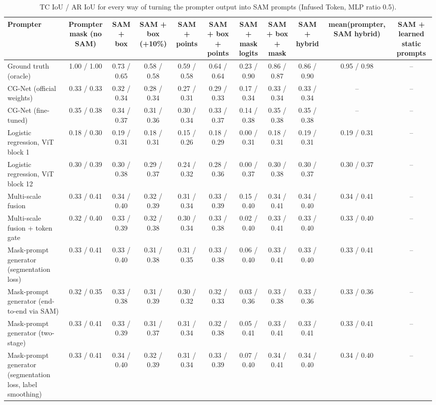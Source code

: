 \begin{table}[htbp]
\centering
\small
\begin{adjustbox}{max width=\linewidth}
\begin{tabular}{lcccccccccc}
\toprule
Prompter & Prompter mask (no SAM) & SAM + box & SAM + box (+10\%) & SAM + points & SAM + box + points & SAM + mask logits & SAM + box + mask & SAM + hybrid & mean(prompter, SAM hybrid) & SAM + learned static prompts \\
\midrule
Ground truth (oracle) & 1.00 / 1.00 & 0.73 / 0.65 & 0.58 / 0.58 & 0.59 / 0.58 & 0.64 / 0.64 & 0.23 / 0.90 & 0.86 / 0.87 & 0.86 / 0.90 & 0.95 / 0.98 & -- \\
CG-Net (official weights) & 0.33 / 0.33 & 0.32 / 0.34 & 0.28 / 0.34 & 0.27 / 0.31 & 0.29 / 0.33 & 0.17 / 0.34 & 0.33 / 0.34 & 0.33 / 0.34 & -- & -- \\
CG-Net (fine-tuned) & 0.35 / 0.38 & 0.34 / 0.37 & 0.31 / 0.36 & 0.30 / 0.34 & 0.33 / 0.37 & 0.14 / 0.38 & 0.35 / 0.38 & 0.35 / 0.38 & -- & -- \\
Logistic regression, ViT block 1 & 0.18 / 0.30 & 0.19 / 0.31 & 0.18 / 0.31 & 0.15 / 0.26 & 0.18 / 0.29 & 0.00 / 0.31 & 0.18 / 0.31 & 0.19 / 0.31 & 0.19 / 0.31 & -- \\
Logistic regression, ViT block 12 & 0.30 / 0.39 & 0.30 / 0.38 & 0.29 / 0.37 & 0.24 / 0.32 & 0.28 / 0.36 & 0.00 / 0.37 & 0.30 / 0.38 & 0.30 / 0.37 & 0.30 / 0.37 & -- \\
Multi-scale fusion & 0.33 / 0.41 & 0.34 / 0.40 & 0.32 / 0.39 & 0.31 / 0.34 & 0.33 / 0.39 & 0.15 / 0.40 & 0.34 / 0.41 & 0.34 / 0.40 & 0.34 / 0.41 & -- \\
Multi-scale fusion + token gate & 0.32 / 0.40 & 0.33 / 0.39 & 0.32 / 0.38 & 0.30 / 0.34 & 0.33 / 0.38 & 0.02 / 0.40 & 0.33 / 0.41 & 0.33 / 0.40 & 0.33 / 0.40 & -- \\
Mask-prompt generator (segmentation loss) & 0.33 / 0.41 & 0.33 / 0.40 & 0.31 / 0.38 & 0.31 / 0.35 & 0.33 / 0.38 & 0.06 / 0.40 & 0.33 / 0.41 & 0.33 / 0.40 & 0.33 / 0.41 & -- \\
Mask-prompt generator (end-to-end via SAM) & 0.32 / 0.35 & 0.33 / 0.38 & 0.31 / 0.39 & 0.30 / 0.32 & 0.32 / 0.33 & 0.03 / 0.36 & 0.33 / 0.38 & 0.33 / 0.36 & 0.33 / 0.36 & -- \\
Mask-prompt generator (two-stage) & 0.33 / 0.41 & 0.33 / 0.39 & 0.31 / 0.37 & 0.31 / 0.34 & 0.32 / 0.38 & 0.05 / 0.41 & 0.33 / 0.41 & 0.33 / 0.41 & 0.33 / 0.41 & -- \\
Mask-prompt generator (segmentation loss, label smoothing) & 0.33 / 0.41 & 0.34 / 0.40 & 0.32 / 0.39 & 0.31 / 0.34 & 0.33 / 0.39 & 0.07 / 0.40 & 0.34 / 0.41 & 0.34 / 0.40 & 0.34 / 0.40 & -- \\
\bottomrule
\end{tabular}
\end{adjustbox}
\caption{TC IoU / AR IoU for every way of turning the prompter output into SAM prompts (Infused Token, MLP ratio 0.5).}
\label{tab:prompt_conversion_infused_mlp05}
\end{table}
